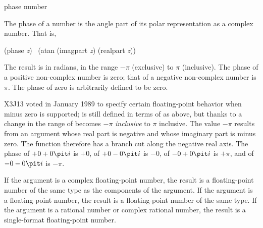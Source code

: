 \begin{defun}[Function]
phase number

The phase of a number is the angle part of its polar representation
as a complex number.  That is,
\begin{lisp}
(phase {\it z}) \EQ\ (atan (imagpart {\it z}) (realpart {\it z}))
\end{lisp}
\begin{obsolete}
The result is in radians, in the range $-\pi$ (exclusive)
to $\pi$ (inclusive).  The phase of a positive non-complex number
is zero; that of a negative non-complex number is $\pi$.
The phase of zero is arbitrarily defined to be zero.
\end{obsolete}

\begin{new}
X3J13 voted in January 1989
to specify certain floating-point behavior when minus zero is supported;
 is still defined in terms of  as above,
but thanks to a change in  the range of 
becomes $-\pi$ {\it inclusive} to $\pi$ inclusive.  The value $-\pi$
results from an argument
whose real part is negative and whose imaginary
part is minus zero.  The  function therefore has a branch cut
along the negative real axis.  The phase of $+0+0{\it i}$ is $+0$, of $+0-0{\it i}$ is $-0$,
of $-0+0{\it i}$ is $+\pi$, and of $-0-0{\it i}$ is $-\pi$.
\end{new}

If the argument is a complex floating-point number, the result
is a floating-point number of the same type as the components of
the argument.
If the argument is a floating-point number, the result is a
floating-point number of the same type.
If the argument is a rational number or complex rational number, the result
is a single-format floating-point number.
\end{defun}

